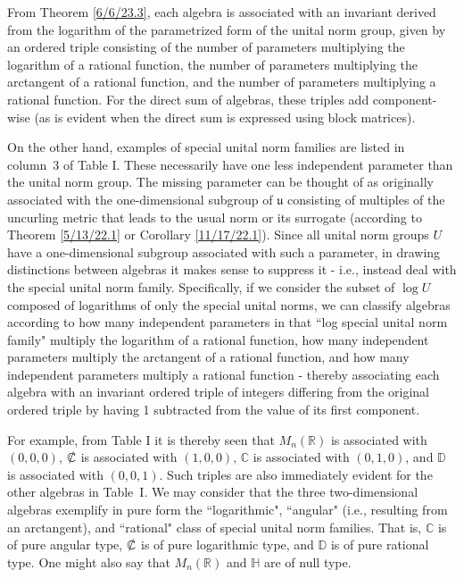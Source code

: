 \documentclass{amsart}
\numberwithin{equation}{section}
\theoremstyle{definition}
\numberwithin{theorem}{section}
\begin{document}
 From Theorem \ref{6/6/23.3}, each algebra is associated with an invariant derived from the logarithm of the parametrized form of the unital norm group, given by an ordered triple consisting of the number of parameters multiplying the logarithm of a rational function, the number of parameters multiplying the arctangent of a rational function, and the
 \enlargethispage{1cm} number of parameters multiplying a rational function.  For the direct sum of algebras, these triples add component-wise (as is evident when the direct sum is expressed using block matrices).

On the other hand, examples of special unital norm families are listed in \mbox{column 3} of Table I.  These necessarily have one less independent parameter than the unital norm group.  The missing parameter can be thought of as originally associated with the one-dimensional subgroup of $\mathfrak{u}$ consisting of multiples of the uncurling metric that leads to the usual norm or its surrogate (according to Theorem \ref{5/13/22.1} or Corollary \ref{11/17/22.1}).  Since all unital norm groups $U$ have a one-dimensional subgroup associated with such a parameter, in drawing distinctions between algebras it makes sense to suppress it - i.e., instead deal with the special unital norm family.  Specifically, if we consider the subset of $\log U$ composed of logarithms of only the special unital norms, we can classify algebras according to how many independent parameters in that ``log special unital norm family" multiply the logarithm of a rational function, how many independent parameters multiply the arctangent of a rational function, and how many independent parameters multiply a rational function - thereby associating each algebra with an invariant ordered triple of integers differing from the original ordered triple by having 1 subtracted from the value of its first component.
 

For example, from Table I it is thereby seen that $M_n(\mathbb{R})$ is associated with $(0,0,0)$,  $\slashed{\mathbb{C}}$ is associated with $(1,0,0)$, $\mathbb{C}$ is associated with $(0,1,0)$, and $\mathbb{D}$ is associated with $(0,0,1)$.  Such triples are also immediately evident for the other algebras in \mbox{Table I}.
We may consider that the three two-dimensional algebras exemplify in pure form the ``logarithmic", ``angular" (i.e., resulting from an arctangent), and ``rational" class of special unital norm families.  That is, $\mathbb{C}$ is of pure angular type, $\slashed{\mathbb{C}}$ is of pure logarithmic type, and $\mathbb{D}$ is of pure rational type. One might also say that $M_n(\mathbb{R})$ and $\mathbb{H}$ are of null type. 
 
\end{document}

